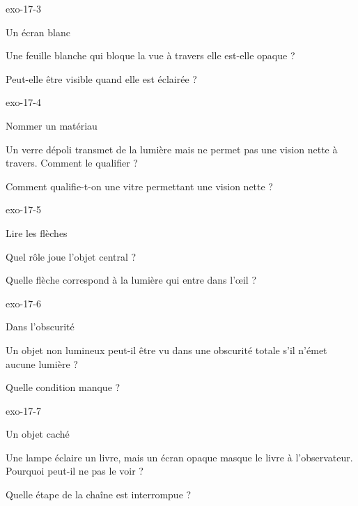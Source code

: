 \documentclass[12pt,twoside,openany]{book}
\begin{document}
\begin{blocLivre}{exo-17-3}
\begin{exercice}[1]{Un écran blanc}
\begin{questions}
\item Une feuille blanche qui bloque la vue à travers elle est-elle opaque ?
\item Peut-elle être visible quand elle est éclairée ?
\end{questions}
\end{exercice}\end{blocLivre}
\begin{blocLivre}{exo-17-4}
\begin{exercice}[1]{Nommer un matériau}
\begin{questions}
\item Un verre dépoli transmet de la lumière mais ne permet pas une vision nette à travers. Comment le qualifier ?
\item Comment qualifie-t-on une vitre permettant une vision nette ?
\end{questions}
\end{exercice}\end{blocLivre}
\begin{blocLivre}{exo-17-5}
\begin{exercice}[1]{Lire les flèches}
\begin{questions}
\item Quel rôle joue l’objet central ?
\item Quelle flèche correspond à la lumière qui entre dans l’œil ?
\end{questions}
\end{exercice}\end{blocLivre}
\begin{blocLivre}{exo-17-6}
\begin{exercice}[2]{Dans l’obscurité}
\begin{questions}
\item Un objet non lumineux peut-il être vu dans une obscurité totale s’il n’émet aucune lumière ?
\item Quelle condition manque ?
\end{questions}
\end{exercice}\end{blocLivre}
\begin{blocLivre}{exo-17-7}
\begin{exercice}[2]{Un objet caché}
\begin{questions}
\item Une lampe éclaire un livre, mais un écran opaque masque le livre à l’observateur. Pourquoi peut-il ne pas le voir ?
\item Quelle étape de la chaîne est interrompue ?
\end{questions}
\end{exercice}\end{blocLivre}
\end{document}
